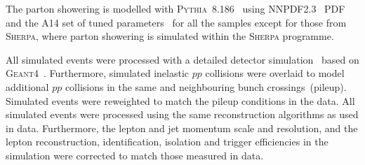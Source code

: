 The parton showering is modelled with \textsc{Pythia}~8.186~\cite{Sjostrand:2007gs} using NNPDF2.3~\cite{Ball:2012cx} PDF and the A14 set of tuned parameters~\cite{ATL-PHYS-PUB-2014-021}
for all the samples except for those from \textsc{Sherpa}, where parton showering is simulated within the \textsc{Sherpa} programme.

All simulated events were processed with a detailed detector simulation~\cite{SOFT-2010-01} based on \textsc{Geant4}~\cite{Agostinelli:2002hh}.
Furthermore, simulated inelastic $pp$ collisions were overlaid to model additional $pp$ collisions in the same and neighbouring bunch crossings~(pileup).
Simulated events were reweighted to match the pileup conditions in the data. All simulated events were processed using the same reconstruction algorithms as used in data.
Furthermore, the lepton and jet momentum scale and resolution, and the lepton reconstruction, identification, isolation and trigger efficiencies in the simulation were corrected to match those measured in data.


